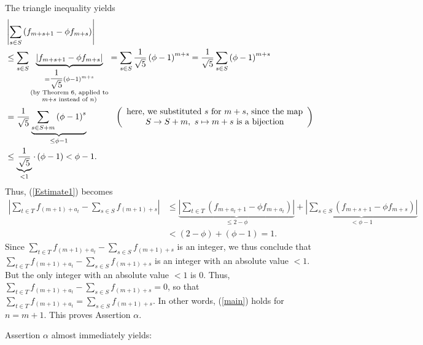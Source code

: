 \documentclass[12pt,final,notitlepage,onecolumn]{article}%
\begin{document}
The triangle inequality yields%
\begin{align*}
&  \left\vert \sum\limits_{s\in S}\left(  f_{m+s+1}-\phi f_{m+s}\right)
\right\vert \\
&  \leq\sum\limits_{s\in S}\underbrace{\left\vert f_{m+s+1}-\phi
f_{m+s}\right\vert }_{\substack{=\dfrac{1}{\sqrt{5}}\left(  \phi-1\right)
^{m+s}\\\text{(by Theorem 6, applied to}\\m+s\text{ instead of }n\text{)}%
}}=\sum\limits_{s\in S}\dfrac{1}{\sqrt{5}}\left(  \phi-1\right)  ^{m+s}%
=\dfrac{1}{\sqrt{5}}\sum\limits_{s\in S}\left(  \phi-1\right)  ^{m+s}\\
&  =\dfrac{1}{\sqrt{5}}\underbrace{\sum\limits_{s\in S+m}\left(
\phi-1\right)  ^{s}}_{\leq\phi-1}\ \ \ \ \ \ \ \ \ \ \left(
\begin{array}
[c]{c}%
\text{here, we substituted }s\text{ for }m+s\text{, since the map}\\
S\rightarrow S+m,\ s\mapsto m+s\text{ is a bijection}%
\end{array}
\right) \\
&  \leq\underbrace{\dfrac{1}{\sqrt{5}}}_{<1}\cdot\left(  \phi-1\right)
<\phi-1.
\end{align*}
Thus, (\ref{Estimate1}) becomes%
\begin{align}
\left\vert \sum\limits_{t\in T}f_{\left(  m+1\right)  +a_{t}}-\sum
\limits_{s\in S}f_{\left(  m+1\right)  +s}\right\vert  &  \leq
\underbrace{\left\vert \sum\limits_{t\in T}\left(  f_{m+a_{t}+1}-\phi
f_{m+a_{t}}\right)  \right\vert }_{\leq2-\phi}+\underbrace{\left\vert
\sum\limits_{s\in S}\left(  f_{m+s+1}-\phi f_{m+s}\right)  \right\vert
}_{<\phi-1}\nonumber\\
&  <\left(  2-\phi\right)  +\left(  \phi-1\right)  =1.\nonumber
\end{align}
Since $\sum\limits_{t\in T}f_{\left(  m+1\right)  +a_{t}}-\sum\limits_{s\in
S}f_{\left(  m+1\right)  +s}$ is an integer, we thus conclude that
$\sum\limits_{t\in T}f_{\left(  m+1\right)  +a_{t}}-\sum\limits_{s\in
S}f_{\left(  m+1\right)  +s}$ is an integer with an absolute value $<1$. But
the only integer with an absolute value $<1$ is $0$. Thus, $\sum\limits_{t\in
T}f_{\left(  m+1\right)  +a_{t}}-\sum\limits_{s\in S}f_{\left(  m+1\right)
+s}=0$, so that $\sum\limits_{t\in T}f_{\left(  m+1\right)  +a_{t}}%
=\sum\limits_{s\in S}f_{\left(  m+1\right)  +s}$. In other words, (\ref{main})
holds for $n=m+1$. This proves Assertion $\alpha$.

Assertion $\alpha$ almost immediately yields:
\end{document}
